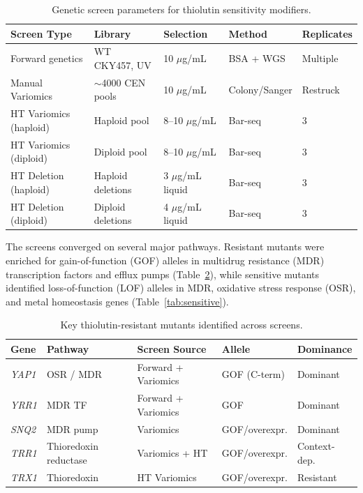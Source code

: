 \documentclass[11pt,a4paper]{article}
\begin{document}
\begin{table}[htbp]
\centering
\caption{Genetic screen parameters for thiolutin sensitivity modifiers.}
\label{tab:screens}
\small
\begin{tabular}{lllll}
\toprule
\textbf{Screen Type} & \textbf{Library} & \textbf{Selection} & \textbf{Method} & \textbf{Replicates} \\
\midrule
Forward genetics & WT CKY457, UV & 10 $\mu$g/mL & BSA + WGS & Multiple \\
Manual Variomics & $\sim$4000 CEN pools & 10 $\mu$g/mL & Colony/Sanger & Restruck \\
HT Variomics (haploid) & Haploid pool & 8--10 $\mu$g/mL & Bar-seq & 3 \\
HT Variomics (diploid) & Diploid pool & 8--10 $\mu$g/mL & Bar-seq & 3 \\
HT Deletion (haploid) & Haploid deletions & 3 $\mu$g/mL liquid & Bar-seq & 3 \\
HT Deletion (diploid) & Diploid deletions & 4 $\mu$g/mL liquid & Bar-seq & 3 \\
\bottomrule
\end{tabular}
\end{table}

The screens converged on several major pathways. Resistant mutants were enriched for gain-of-function (GOF) alleles in multidrug resistance (MDR) transcription factors and efflux pumps (Table~\ref{tab:resistant}), while sensitive mutants identified loss-of-function (LOF) alleles in MDR, oxidative stress response (OSR), and metal homeostasis genes (Table~\ref{tab:sensitive}).

\begin{table}[htbp]
\centering
\caption{Key thiolutin-resistant mutants identified across screens.}
\label{tab:resistant}
\small
\begin{tabular}{lllll}
\toprule
\textbf{Gene} & \textbf{Pathway} & \textbf{Screen Source} & \textbf{Allele} & \textbf{Dominance} \\
\midrule
\textit{YAP1} & OSR / MDR & Forward + Variomics & GOF (C-term) & Dominant \\
\textit{YRR1} & MDR TF & Forward + Variomics & GOF & Dominant \\
\textit{SNQ2} & MDR pump & Variomics & GOF/overexpr. & Dominant \\
\textit{TRR1} & Thioredoxin reductase & Variomics + HT & GOF/overexpr. & Context-dep. \\
\textit{TRX1} & Thioredoxin & HT Variomics & GOF/overexpr. & Resistant \\
\bottomrule
\end{tabular}
\end{table}
\end{document}

